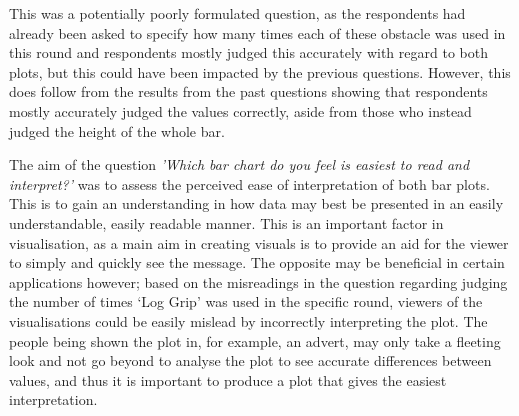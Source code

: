 \documentclass[
]{article}
\begin{document}
This was a potentially poorly formulated question, as the respondents
had already been asked to specify how many times each of these obstacle
was used in this round and respondents mostly judged this accurately
with regard to both plots, but this could have been impacted by the
previous questions. However, this does follow from the results from the
past questions showing that respondents mostly accurately judged the
values correctly, aside from those who instead judged the height of the
whole bar.

The aim of the question
\textit{'Which bar chart do you feel is easiest to read and interpret?'}
was to assess the perceived ease of interpretation of both bar plots.
This is to gain an understanding in how data may best be presented in an
easily understandable, easily readable manner. This is an important
factor in visualisation, as a main aim in creating visuals is to provide
an aid for the viewer to simply and quickly see the message. The
opposite may be beneficial in certain applications however; based on the
misreadings in the question regarding judging the number of times `Log
Grip' was used in the specific round, viewers of the visualisations
could be easily mislead by incorrectly interpreting the plot. The people
being shown the plot in, for example, an advert, may only take a
fleeting look and not go beyond to analyse the plot to see accurate
differences between values, and thus it is important to produce a plot
that gives the easiest interpretation.
\end{document}
